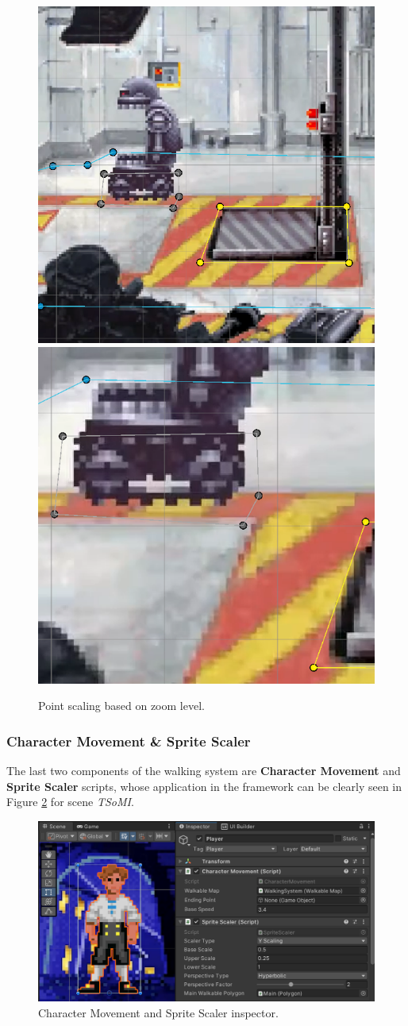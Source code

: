 \begin{figure}[H]
\centering
\includegraphics[width=.48\linewidth]{img/User doc/point_scaling.png}
\includegraphics[width=.48\linewidth]{img/User doc/point_scaling2.png}
\caption{Point scaling based on zoom level.}
\label{fig:Manual-Zoom}
\end{figure}

\subsubsection{Character Movement \& Sprite Scaler}
\label{Manual:ChM&SS}
The last two components of the walking system are \textbf{Character Movement} and \textbf{Sprite Scaler} scripts, whose application in the framework can be clearly seen in Figure \ref{fig:Manual-ChM&SS} for scene \textit{TSoMI}. 

\begin{figure}[H]
\centering
\includegraphics[width=0.85\linewidth]{img/User doc/character_movement.png}
\caption{Character Movement and Sprite Scaler inspector.}
\label{fig:Manual-ChM&SS}
\end{figure}


